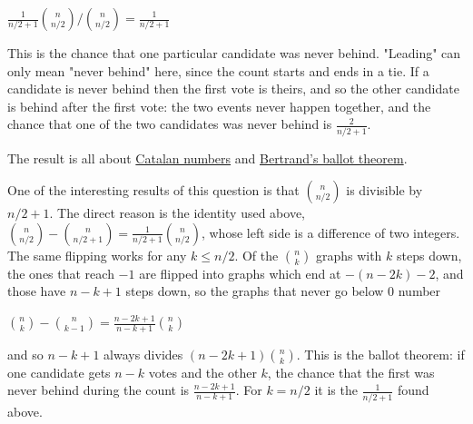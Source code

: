 $\frac{1}{n/2+1}{n \choose n/2} / {n \choose n/2} = \frac{1}{n/2+1}$

This is the chance that one particular candidate was never behind. "Leading" can only mean "never behind"
here, since the count starts and ends in a tie. If a candidate is never behind then the first vote is
theirs, and so the other candidate is behind after the first vote: the two events never happen together,
and the chance that one of the two candidates was never behind is $\frac{2}{n/2+1}$.

The result is all about \href{https://en.wikipedia.org/wiki/Catalan_number}{Catalan numbers}
and \href{https://en.wikipedia.org/wiki/Bertrand\%27s_ballot_theorem}{Bertrand's ballot theorem}.

One of the interesting results of this question is that ${n \choose n/2}$ is divisible by $n/2+1$. The
direct reason is the identity used above, ${n \choose n/2}-{n \choose n/2+1}=\frac{1}{n/2+1}{n \choose n/2}$,
whose left side is a difference of two integers. The same flipping works for any $k\le n/2$. Of the
${n \choose k}$ graphs with $k$ steps down, the ones that reach $-1$ are flipped into graphs which end at
$-(n-2k)-2$, and those have $n-k+1$ steps down, so the graphs that never go below 0 number
\begin{center}
${n \choose k}-{n \choose k-1} = \frac{n-2k+1}{n-k+1}{n \choose k}$
\end{center}
and so $n-k+1$ always divides $(n-2k+1){n \choose k}$. This is the ballot theorem: if one candidate gets
$n-k$ votes and the other $k$, the chance that the first was never behind during the count is
$\frac{n-2k+1}{n-k+1}$. For $k=n/2$ it is the $\frac{1}{n/2+1}$ found above.
